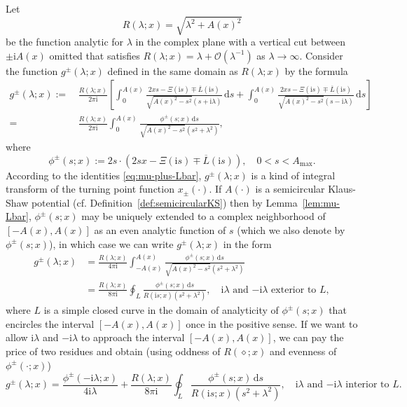 \documentclass[12pt]{amsart}
\numberwithin{equation}{section}
\newcommand{\dd}{\mathrm{d}}
\newcommand{\ii}{\mathrm{i}}
\newcommand{\SP}{\lambda}
\newcommand{\tailint}{\Xi}
\newcommand{\bigo}[1]{ \mathcal{O}\! \left( #1 \right) }
\begin{document}
Let 
\begin{equation}
	R(\SP;x) = \sqrt{\SP^2 + A(x)^2}
\end{equation}	
be the function analytic for $\SP$ in the complex plane with a vertical cut between $\pm \ii A(x)$ omitted  that satisfies $R(\SP;x)=\SP+\bigo{\SP^{-1}}$ as $\SP\to\infty$.  Consider the function $g^\pm(\SP;x)$ defined in the same domain as $R(\SP;x)$ by the formula
\begin{align}
g^\pm(\SP;x):=&\,\frac{R(\SP;x)}{2\pi \ii}\left[\int_0^{A(x)}
\frac{2xs-\tailint(\ii s)\mp \overline{L}(\ii s)}{\sqrt{A(x)^2-s^2}(s+\ii \SP)}\,\dd s 
+ 
\int_0^{A(x)}\frac{2xs-\tailint(\ii s)\mp\overline{L}(\ii s)}{\sqrt{A(x)^2-s^2}(s-\ii \SP)}\,\dd s\right]\nonumber\\
{}=&\,\frac{R(\SP;x)}{2\pi \ii}\int_0^{A(x)}\frac{\phi^\pm(s;x)\,\dd s}{\sqrt{A(x)^2-s^2}(s^2+\SP^2)},
\label{eq:g-functions-zeta}
\end{align}
where 
\begin{equation}
\phi^\pm(s;x):=2s\cdot(2sx-\tailint(\ii s)\mp\overline{L}(\ii s)),\quad 0<s<A_\mathrm{max}.
\label{eq:phi-pm-define}
\end{equation}  
According to the identities \eqref{eq:mu-plus-Lbar}, $g^\pm(\SP;x)$ is a kind of integral transform of the turning point function $x_\pm(\cdot)$.  If $A(\cdot)$ is a semicircular Klaus-Shaw potential (cf. Definition~\ref{def:semicircularKS}) then by Lemma~\ref{lem:mu-Lbar}, $\phi^\pm(s;x)$ may be uniquely extended to a complex neighborhood of $[-A(x),A(x)]$ as an even analytic function of $s$ (which we also denote by $\phi^\pm(s;x)$), in which case we can write $g^\pm(\SP;x)$ in the form
\begin{equation}
\begin{split}
g^\pm(\SP;x)&=\frac{R(\SP;x)}{4\pi \ii}\int_{-A(x)}^{A(x)}\frac{\phi^\pm(s;x)\,\dd s}{\sqrt{A(x)^2-s^2}(s^2+\SP^2)} \\ &= \frac{R(\SP;x)}{8\pi \ii}\oint_L\frac{\phi^\pm(s;x)\,\dd s}{R(\ii s;x)(s^2+\SP^2)},\quad \text{$\ii\SP$ and $-\ii\SP$ exterior to $L$},
\end{split}
\label{eq:g-functions-zeta-outside}
\end{equation}
where $L$ is a simple closed curve in the domain of analyticity of $\phi^\pm(s;x)$ that encircles the interval $[-A(x),A(x)]$ 
once in the positive sense.  If we want to allow $\ii\SP$ and $-\ii\SP$ to approach the interval $[-A(x),A(x)]$, we can pay the price of two residues
and obtain (using oddness of $R(\diamond;x)$ and evenness of $\phi^\pm(\cdot;x)$)
\begin{equation}
g^\pm(\SP;x)=\frac{\phi^\pm(-\ii\SP;x)}{4\ii\SP}+\frac{R(\SP;x)}{8\pi \ii}
\oint_{L}\frac{\phi^\pm(s;x)\,\dd s}{R(\ii s;x)(s^2+\SP^2)},\quad \text{$\ii\SP$ and $-\ii\SP$ interior to $L$}.
\label{eq:g-functions-zeta-inside}
\end{equation}
\end{document}
